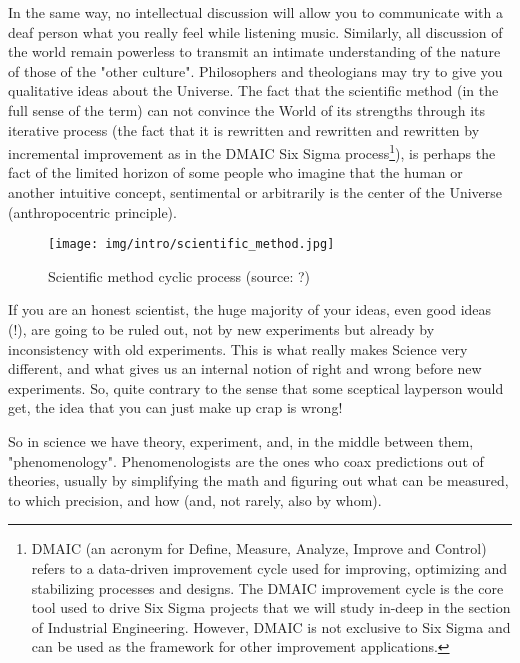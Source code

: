 	In the same way, no intellectual discussion will allow you to communicate with a deaf person what you really feel while listening music. Similarly, all discussion of the world remain powerless to transmit an intimate understanding of the nature of those of the "other culture". Philosophers and theologians may try to give you qualitative ideas about the Universe. The fact that the scientific method (in the full sense of the term) can not convince the World of its strengths through its iterative process (the fact that it is rewritten and rewritten and rewritten by incremental improvement as in the DMAIC Six Sigma process\footnote{DMAIC (an acronym for Define, Measure, Analyze, Improve and Control) refers to a data-driven improvement cycle used for improving, optimizing and stabilizing processes and designs. The DMAIC improvement cycle is the core tool used to drive Six Sigma projects that we will study in-deep in the section of Industrial Engineering. However, DMAIC is not exclusive to Six Sigma and can be used as the framework for other improvement applications.}), is perhaps the fact of the limited horizon of some people who imagine that the human or another intuitive concept, sentimental or arbitrarily is the center of the Universe (anthropocentric principle).
	\begin{figure}[H]
		\centering
		\texttt{[image: img/intro/scientific\_method.jpg]}
		\caption[Scientific method cyclic process]{Scientific method cyclic process (source: ?)}
	\end{figure} 
	
	\begin{tcolorbox}[title=Remark,arc=10pt,breakable,drop lifted shadow,
  skin=enhanced,
  skin first is subskin of={enhancedfirst}{arc=10pt,no shadow},
  skin middle is subskin of={enhancedmiddle}{arc=10pt,no shadow},
  skin last is subskin of={enhancedlast}{drop lifted shadow}]
	If you are an honest scientist, the huge majority of your ideas, even good
ideas (!), are going to be ruled out, not by new experiments but already by
inconsistency with old experiments. This is what really makes Science very
different, and what gives us an internal notion of right and wrong before new
experiments. So, quite contrary to the sense that some sceptical layperson
would get, the idea that you can just make up crap is wrong!
	\end{tcolorbox}
	
	So in science we have theory, experiment, and, in the middle between
them, "phenomenology". Phenomenologists are the ones who coax predictions out of theories, usually by simplifying the math and figuring out what can be measured, to which precision, and how (and, not rarely, also by whom).

